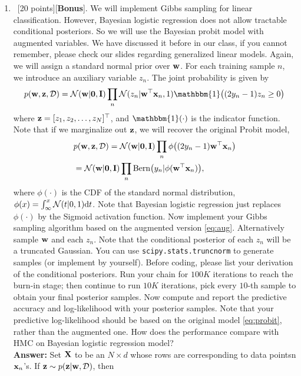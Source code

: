 \documentclass[12pt, fullpage,letterpaper]{article}
\def\red{\color{black!30!red}}
\def\blackblue{\color{black!40!blue}}
\begin{document}
\begin{enumerate}
\begin{enumerate}
		\item~[20 points][\textbf{Bonus}]. We will implement Gibbs sampling for linear classification. However, Bayesian logistic regression does not allow tractable conditional posteriors. So we will use the Bayesian probit model with augmented variables. We have discussed it before in our class, if you cannot remember, please check our slides regarding generalized linear models. Again, we will assign a standard normal prior over ${\bf w}$. For each training sample $n$, we introduce an auxiliary variable $z_n$. The joint probability is given by
		\begin{align}
		p(\w, \z, \Dcal) = \N(\w|\0, \I)\prod_n \N(z_n|\w^\top \x_n, 1)\mathbbm{1}\big((2y_n-1)z_n\ge 0\big) \label{eq:aug}
		\end{align}
		where ${\bf z} = [z_1, z_2, \ldots, z_N]^\top$, and $\mathbbm{1}(\cdot)$ is the indicator function. Note that if we marginalize out ${\bf z}$, we will recover the original Probit model, 
		\begin{align}
		&p({\bf w}, {\bf z}, \mathcal{D}) = \mathcal{N}({\bf w}|{\bf 0}, {\bf I})\prod_n \phi\big((2y_n-1){\bf w}^\top {\bf x}_n\big) \notag \\
		&=\mathcal{N}({\bf w}|{\bf 0}, {\bf I})\prod_n \mathrm{Bern}\big(y_n|\phi({\bf w}^\top {\bf x}_n)\big), \label{eq:probit}
		\end{align}
		where $\phi(\cdot)$ is the CDF of the standard normal distribution, $\phi(x) = \int_\infty^x \mathcal{N}(t|0, 1){\rm d} t$. Note that Bayesian logistic regression just replaces $\phi(\cdot)$ by the Sigmoid activation function. Now implement your Gibbs sampling algorithm based on the augmented version \eqref{eq:aug}. Alternatively sample ${\bf w}$ and each $z_n$. Note that the conditional posterior of each $z_n$ will be a truncated Gaussian. You can use \texttt{scipy.stats.truncnorm} to generate samples (or implement by yourself). Before coding, please list your derivation of the conditional posteriors. Run your chain for $100K$ iterations to reach the burn-in stage; then continue to run $10K$ iterations, pick every $10$-th sample to obtain your final posterior samples. Now compute and report the predictive accuracy and log-likelihood with your posterior samples. Note that your predictive log-likelihood should be based on the original model \eqref{eq:probit}, rather than the augmented one. How does the performance compare with HMC on Bayesian logistic regression model?\\
{\bf \red Answer: }{\blackblue 
Set ${\bf X}$ to be an $N \times d$ whose rows are corresponding to data pointsn ${\bf x}_n$'s.
If ${\bf z} \sim p({\bf z}| {\bf w}, \mathcal{D})$, then 
\begin{align*}

\end{align*}}
\end{enumerate}
\end{enumerate}
\end{document}
